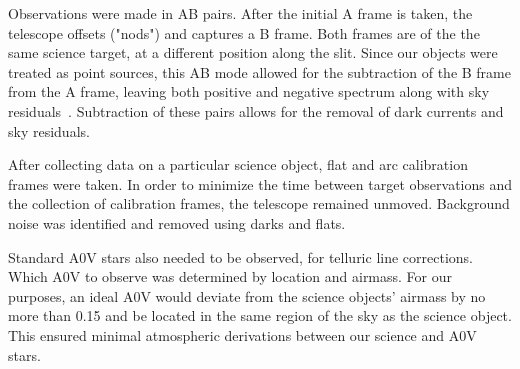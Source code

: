 Observations were made in AB pairs.  After the initial A frame is taken, the telescope offsets ("nods") and captures a B frame.  Both frames are of the the same science target, at a different position along the slit.  Since our objects were treated as point sources, this AB mode allowed for the subtraction of the B frame from the A frame, leaving both positive and negative spectrum along with sky residuals~\cite{Cushing_2004}. Subtraction of these pairs allows for the removal of dark currents and sky residuals.



After collecting data on a particular science object, 
flat and arc calibration frames were taken.  
In order to minimize the time between target observations and 
the collection of calibration frames, the telescope remained unmoved.  
Background noise was identified and removed using darks and flats.



Standard A0V stars also needed to be observed, for telluric line corrections.  Which A0V 
to observe was determined by location and airmass.  For our purposes, an ideal A0V would 
deviate from the science objects' airmass by no more than 0.15 and be located 
in the same region of the sky as the science object.  This ensured minimal 
atmospheric derivations between our science and A0V stars.

